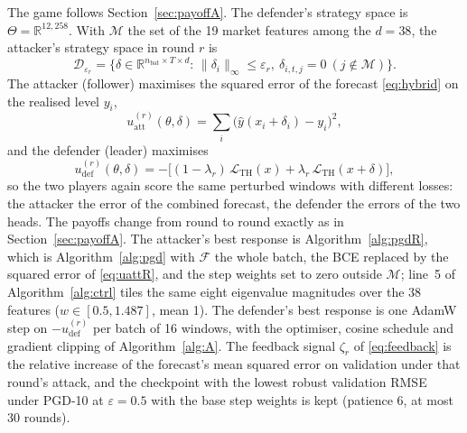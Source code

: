 \documentclass[conference]{IEEEtran}
\newcommand{\cL}{\mathcal{L}}
\begin{document}
The game follows Section~\ref{sec:payoffA}. The defender's strategy space is $\Theta=\mathbb R^{12{,}258}$. With $\mathcal M$ the set of the 19 market features among the $d{=}38$, the attacker's strategy space in round $r$ is
\begin{equation}
\mathcal D_{\varepsilon_r}=\big\{\delta\in\mathbb R^{n_{\mathrm{bat}}\times T\times d}\!:\, \|\delta_i\|_\infty\le\varepsilon_r,\ \delta_{i,t,j}=0\ (j\notin\mathcal M)\big\}.
\label{eq:DR}
\end{equation}
The attacker (follower) maximises the squared error of the forecast \eqref{eq:hybrid} on the realised level $y_i$,
\begin{equation}
u^{(r)}_{\mathrm{att}}(\theta,\delta)=\sum_{i}\big(\hat y(x_i+\delta_i)-y_i\big)^2,
\label{eq:uattR}
\end{equation}
and the defender (leader) maximises
\begin{equation}
u^{(r)}_{\mathrm{def}}(\theta,\delta)=-\big[(1-\lambda_r)\,\cL_{\mathrm{TH}}(x)+\lambda_r\,\cL_{\mathrm{TH}}(x+\delta)\big],
\label{eq:defobjR}
\end{equation}
so the two players again score the same perturbed windows with different losses: the attacker the error of the combined forecast, the defender the errors of the two heads. The payoffs change from round to round exactly as in Section~\ref{sec:payoffA}. The attacker's best response is Algorithm~\ref{alg:pgdR}, which is Algorithm~\ref{alg:pgd} with $\mathcal F$ the whole batch, the BCE replaced by the squared error of \eqref{eq:uattR}, and the step weights set to zero outside $\mathcal M$; line~5 of Algorithm~\ref{alg:ctrl} tiles the same eight eigenvalue magnitudes over the 38 features ($w\in[0.5,1.487]$, mean 1). The defender's best response is one AdamW step on $-u^{(r)}_{\mathrm{def}}$ per batch of 16 windows, with the optimiser, cosine schedule and gradient clipping of Algorithm~\ref{alg:A}. The feedback signal $\zeta_r$ of \eqref{eq:feedback} is the relative increase of the forecast's mean squared error on validation under that round's attack, and the checkpoint with the lowest robust validation RMSE under PGD-10 at $\varepsilon{=}0.5$ with the base step weights is kept (patience 6, at most 30 rounds).
\end{document}
